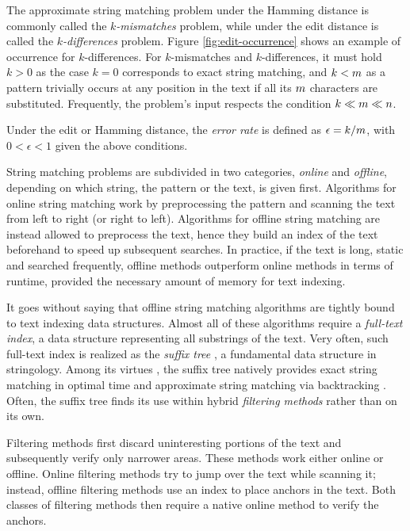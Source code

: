 The approximate string matching problem under the Hamming distance is commonly called the \emph{$k$-mismatches} problem, while under the edit distance is called the \emph{$k$-differences} problem.
Figure \ref{fig:edit-occurrence} shows an example of occurrence for $k$-differences.
For $k$-mismatches and $k$-differences, it must hold $k > 0$ as the case $k = 0$ corresponds to exact string matching, and $k < m$ as a pattern trivially occurs at any position in the text if all its $m$ characters are substituted.
Frequently, the problem's input respects the condition $k \ll m \ll n$.
\begin{definition}
Under the edit or Hamming distance, the \emph{error rate} is defined as $\epsilon = k/m$, with $0 < \epsilon < 1$ given the above conditions.
\end{definition}

String matching problems are subdivided in two categories, \emph{online} and \emph{offline}, depending on which string, the pattern or the text, is given first.
Algorithms for online string matching work by preprocessing the pattern and scanning the text from left to right (or right to left).
Algorithms for offline string matching are instead allowed to preprocess the text,
hence they build an index of the text beforehand to speed up subsequent searches.
In practice, if the text is long, static and searched frequently, offline methods outperform online methods in terms of runtime, provided the necessary amount of memory for text indexing.

It goes without saying that offline string matching algorithms are tightly bound to text indexing data structures.
Almost all of these algorithms require a \emph{full-text index}, \ie a data structure representing all substrings of the text.
Very often, such full-text index is realized as the \emph{suffix tree} \citep{Weiner1973}, a fundamental data structure in stringology.
Among its virtues \citep{Apostolico1985}, the suffix tree natively provides exact string matching in optimal time and approximate string matching via backtracking \citep{Ukkonen1993}.
Often, the suffix tree finds its use within hybrid \emph{filtering methods} rather than on its own.

Filtering methods first discard uninteresting portions of the text and subsequently verify only narrower areas.
These methods work either online or offline.
Online filtering methods try to jump over the text while scanning it; instead, offline filtering methods use an index to place anchors in the text.
Both classes of filtering methods then require a native online method to verify the anchors.

